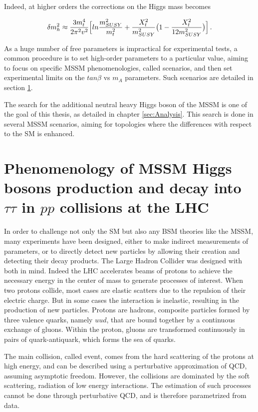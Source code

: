 Indeed, at higher orders the corrections on the Higgs mass becomes \cite{Nagashima:2014tva}

\begin{equation}
    \delta m_h^2 \approx \frac{3 m_t^4}{2\pi^2 v^2} \Big[ ln\frac{m_{SUSY}^2}{m_t^2} + \frac{X_t^2}{m_{SUSY}^2} \big( 1 - \frac{X_t^2}{12 m_{SUSY}^2} \big) \Big] \mend
\end{equation}

As a huge number of free parameters is impractical for experimental tests, a common procedure is to set high-order parameters to a particular value, aiming to focus on specific MSSM phenomenologies, called scenarios, and then set experimental limits on the $tan \beta$ vs $m_A$ parameters. Such scenarios  are detailed in section \ref{sec:pheno}.

The search for the additional neutral heavy Higgs boson of the MSSM is one of the goal of this thesis, as detailed in chapter \ref{sec:Analysis}. This search is done in several MSSM scenarios, aiming for topologies where the differences with respect to the SM is enhanced. 

\section{Phenomenology of MSSM Higgs bosons production and decay into $\tau\tau$ in $pp$ collisions at the LHC}
\label{sec:pheno}

In order to challenge not only the SM but also any BSM theories like the MSSM, many experiments have been designed, either to make indirect measurements of parameters, or to directly detect new particles by allowing their creation and detecting their decay products. The Large Hadron Collider was designed with both in mind. Indeed the LHC accelerates beams of protons to achieve the necessary energy in the center of mass to generate processes of interest. When two protons collide, most cases are elastic scatters due to the repulsion of their electric charge. But in some cases the interaction is inelastic, resulting in the production of new particles. Protons are hadrons, composite particles formed by three valence quarks, namely $uud$, that are bound together by a continuous exchange of gluons. Within the proton, gluons are transformed continuously in pairs of quark-antiquark, which forms the sea of quarks.

The main collision, called event, comes from the hard scattering of the protons at high energy, and can be described using a perturbative approximation of QCD, assuming asymptotic freedom. However, the collisions are dominated by the soft scattering, radiation of low energy interactions. The estimation of such processes cannot be done through perturbative QCD, and is therefore parametrized from data.

